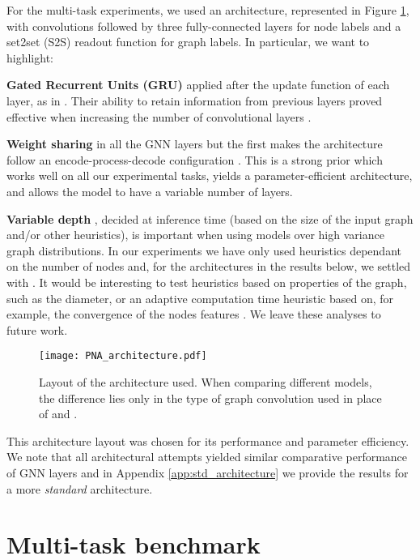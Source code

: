 \documentclass{article}
\begin{document}
For the multi-task experiments, we used an architecture, represented in Figure \ref{fig:architecture}, with  convolutions followed by three fully-connected layers for node labels and a set2set (S2S)\cite{vinyals2015order} readout function for graph labels. In particular, we want to highlight:

\textbf{Gated Recurrent Units (GRU)} \cite{cho2014learning} applied after the update function of each layer, as in \cite{gilmer2017mpnn, li2015gated}. Their ability to retain information from previous layers proved effective when increasing the number of convolutional layers .

\textbf{Weight sharing} in all the GNN layers but the first makes the architecture follow an encode-process-decode configuration \cite{battaglia2018relational, hamrick2018relational}. This is a strong prior which works well on all our experimental tasks, yields a parameter-efficient architecture, and allows the model to have a variable number  of layers.

\textbf{Variable depth} , decided at inference time (based on the size of the input graph and/or other heuristics), is important when using models over high variance graph distributions. In our experiments we have only used heuristics dependant on the number of nodes   and, for the architectures in the results below, we settled with . It would be interesting to test heuristics based on properties of the graph, such as the diameter, or an adaptive computation time heuristic \cite{graves2016adaptive, spinelli2020adaptive} based on, for example, the convergence of the nodes features \cite{velickovic2019neural}. We leave these analyses to future work.

\begin{figure}[h]
\centering
 \texttt{[image: PNA\_architecture.pdf]}
 \caption{Layout of the architecture used. When comparing different models, the difference lies only in the type of graph convolution used in place of  and .}
\label{fig:architecture}
\end{figure}

This architecture layout was chosen for its performance and parameter efficiency. We note that all architectural attempts yielded similar comparative performance of GNN layers and in Appendix \ref{app:std_architecture} we provide the results for a more \textit{standard} architecture.


\section{Multi-task benchmark}
\end{document}
